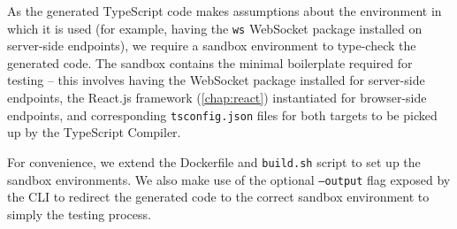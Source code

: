 As the generated TypeScript code makes assumptions about the
environment in which it is used (for example, having the \texttt{ws}
WebSocket package installed on server-side endpoints), we require a
sandbox environment to type-check the generated code. 
The sandbox contains the minimal boilerplate required
for testing -- this involves having the WebSocket package installed
for server-side endpoints, the React.js framework (\cref{chap:react})
instantiated for browser-side endpoints,
and corresponding \texttt{tsconfig.json} files for both targets to
be picked up by the TypeScript Compiler.

For convenience, we extend the
Dockerfile and \texttt{build.sh} script 
to set up the sandbox environments. 
We also make use of the optional
\texttt{--output} flag exposed by the  CLI
to redirect the generated code to the correct sandbox environment
to simply the testing process.